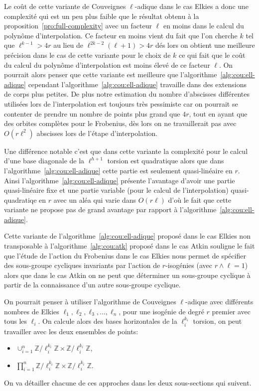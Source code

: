 \documentclass[10pt,a4paper]{book}
\theoremstyle{plain}
\theoremstyle{definition}
\theoremstyle{definition}
\theoremstyle{definition}
\theoremstyle{definition}
\theoremstyle{remark}
\theoremstyle{remark}
\theoremstyle{definition}
\begin{document}
Le coût de cette variante de Couveignes $\ell$-adique dans le cas Elkies a donc
une complexité qui est un peu plus faible que le résultat obtenu à la 
proposition~\ref{pro:full-complexity} avec un facteur $\ell$ en moins dans le 
calcul du polynôme d'interpolation. Ce facteur en moins vient du fait que l'on
cherche $k$ tel que $\ell^{k-1} >4r$ au lieu de $\ell^{2k-2}(\ell+1)>4r$ dés 
lors on obtient une meilleure précision dans le cas de cette variante pour le 
choix de $k$ ce qui fait que le coût du calcul du polynôme d'interpolation est
moins élevé de ce facteur $\ell$. On pourrait alors penser que cette variante
est meilleure que l'algorithme~\ref{alg:cou:ell-adique}
cependant l'algorithme~\ref{alg:cou:ell-adique} travaille dans des extensions 
de corps plus petites.
De plus notre estimation du nombre d'abscisses différentes utilisées lors de
l'interpolation est toujours très pessimiste car on pourrait se contenter de
prendre un nombre de points plus grand que $4r$, tout en ayant que des orbites 
complètes pour le Frobenius, dès lors on ne travaillerait pas avec $O(r\ell^2)$ 
abscisses lors de l'étape d'interpolation.  
 
Une différence notable c'est que dans cette variante la complexité pour le 
calcul d'une base diagonale de la $\ell^{h+1}$ torsion est quadratique alors 
que dans l'algorithme~\ref{alg:cou:ell-adique} cette partie est seulement 
quasi-linéaire en $r$.  Ainsi l'algorithme~\ref{alg:cou:ell-adique} présente
l'avantage d'avoir une partie quasi-linéaire fixe et une partie variable (pour 
le calcul de l'interpolation) quasi-quadratiqe en $r$ avec un aléa qui varie 
dans $O(r\ell)$ d'où le fait que cette variante ne propose pas de grand 
avantage par rapport à l'algorithme~\ref{alg:cou:ell-adique}.

Cette variante de l'algorithme~\ref{alg:cou:ell-adique}  proposé dans le cas 
Elkies non transposable à l'algorithme~\ref{alg:cou:atk} proposé dans le cas 
Atkin souligne le fait que l'étude de l'action du Frobenius dans le cas Elkies 
nous permet de spécifier des sous-groupe cycliques invariants par l'action de 
$r$-isogénies (avec $r \wedge \ell = 1$) alors que dans le cas Atkin on ne peut
que déterminer un sous-groupe cyclique à partir de la connaissance d'un autre 
sous-groupe cyclique.


On pourrait penser à utiliser l'algorithme de Couveignes $\ell$-adique avec 
différents nombres de Elkies $\ell_1, \ell_2, \ell_3, \dots, \ell_{n}$, pour 
une isogénie de degré $r$ premier avec tous les $\ell_i$. On 
calcule alors des bases horizontales de la $\ell_i^{k_i}$ torsion, on peut 
travailler avec les deux ensembles de points:
\begin{itemize}
\item $\cup_{i=1}^n \mathbb{Z}/\ell_i^{k_i} \mathbb{Z} \times \mathbb{Z}/\ell_i^{k_i} \mathbb{Z}$, 
\item $\prod_{i=1}^n \mathbb{Z}/\ell_i^{k_i} \mathbb{Z} \times \mathbb{Z}/\ell_i^{k_i} \mathbb{Z} $.
\end{itemize}
On va détailler chacune de ces approches dans les deux sous-sections qui suivent.
\end{document}
